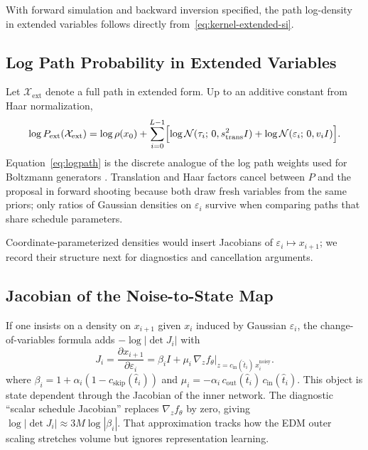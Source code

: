 With forward simulation and backward inversion specified, the path log-density
in extended variables follows directly from~\eqref{eq:kernel-extended-si}.

\subsection{Log Path Probability in Extended Variables}

Let $\mathcal{X}_{\mathrm{ext}}$ denote a full path in extended form. Up to an additive constant from Haar normalization,
\begin{equation}
  \label{eq:logpath}
  \log P_{\mathrm{ext}}(\mathcal{X}_{\mathrm{ext}})
  = \log \rho(x_0)
  + \sum_{i=0}^{L-1}
    \Bigl[
      \log \mathcal{N}(\tau_i;\, 0, s_{\mathrm{trans}}^2 I)
      + \log \mathcal{N}(\varepsilon_i;\, 0, v_i I)
    \Bigr].
\end{equation}
Equation~\eqref{eq:logpath} is the discrete analogue of the log path weights used for Boltzmann generators \citep{falkner2023}. Translation and Haar factors cancel between $P$ and the proposal in forward shooting because both draw fresh variables from the same priors; only ratios of Gaussian densities on $\varepsilon_i$ survive when comparing paths that share schedule parameters.

Coordinate-parameterized densities would insert Jacobians of $\varepsilon_i \mapsto x_{i+1}$;
we record their structure next for diagnostics and cancellation arguments.

\subsection{Jacobian of the Noise-to-State Map}

If one insists on a density on $x_{i+1}$ given $x_i$ induced by Gaussian $\varepsilon_i$, the change-of-variables formula adds $-\log|\det J_i|$ with
\begin{equation}
  \label{eq:jacobian-exact-si}
  J_i = \frac{\partial x_{i+1}}{\partial \varepsilon_i}
  = \beta_i I + \mu_i \,\nabla_z f_\theta\Big|_{z = c_{\mathrm{in}}(\hat{t}_i)\, x^{\mathrm{noisy}}_i}.
\end{equation}
where
$\beta_i = 1 + \alpha_i(1 - c_{\mathrm{skip}}(\hat{t}_i))$ and
$\mu_i = -\alpha_i\, c_{\mathrm{out}}(\hat{t}_i)\, c_{\mathrm{in}}(\hat{t}_i)$.
This object is state dependent through the Jacobian of the inner network. The diagnostic ``scalar schedule Jacobian'' replaces $\nabla_z f_\theta$ by zero, giving $\log|\det J_i| \approx 3M \log|\beta_i|$. That approximation tracks how the EDM outer scaling stretches volume but ignores representation learning.

